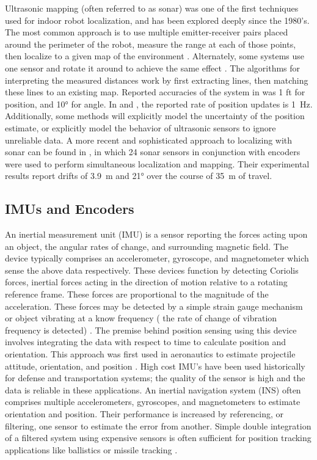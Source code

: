 \documentclass{article}
\begin{document}
    Ultrasonic mapping (often referred to as sonar) was one of the first techniques used for indoor robot localization, and has been explored deeply since the 1980's. The most common approach is to use multiple emitter-receiver pairs placed around the perimeter of the robot, measure the range at each of those points, then localize to a given map of the environment \cite{drumheller_mobile_1987}. Alternately, some systems use one sensor and rotate it around to achieve the same effect \cite{leonard_mobile_1991, drumheller_mobile_1987}. The algorithms for interpreting the measured distances work by first extracting lines, then matching these lines to an existing map. Reported accuracies of the system in \cite{drumheller_mobile_1987} was 1 ft for position, and \ang{10} for angle. In \cite{drumheller_mobile_1987} and \cite{leonard_mobile_1991}, the reported rate of position updates is \SI{1}{\hertz}. Additionally, some methods will explicitly model the uncertainty of the position estimate, or explicitly model the behavior of ultrasonic sensors to ignore unreliable data. A more recent and sophisticated approach to localizing with sonar can be found in \cite{tardos_robust_2002}, in which 24 sonar sensors in conjunction with encoders were used to perform simultaneous localization and mapping. Their experimental results report drifts of \SI{3.9}{\meter} and \ang{21} over the course of \SI{35}{\meter} of travel.

  \subsection{IMUs and Encoders}
    An inertial measurement unit (IMU) is a sensor reporting the forces acting upon an object, the angular rates of change, and surrounding magnetic field. The device typically comprises an accelerometer, gyroscope, and magnetometer which sense the above data respectively. These devices function by detecting Coriolis forces, inertial forces acting in the direction of motion relative to a rotating reference frame. These forces are proportional to the magnitude of the acceleration. These forces may be detected by a simple strain gauge mechanism or object vibrating at a know frequency ( the rate of change of vibration frequency is detected) \cite{barshan_199354}. The premise behind position sensing using this device involves integrating the data with respect to time to calculate position and orientation. This approach was first used in aeronautics to estimate projectile attitude, orientation, and position \cite{agard_1989}. High cost IMU's have been used historically for defense and transportation systems; the quality of the sensor is high and the data is reliable in these applications. An inertial navigation system (INS) often comprises multiple accelerometers, gyroscopes, and magnetometers to estimate orientation and position. Their performance is increased by referencing, or filtering, one sensor to estimate the error from another. Simple double integration of a filtered system using expensive sensors is often sufficient for position tracking applications like ballistics or missile tracking \cite{barshan_199354}.
\end{document}
